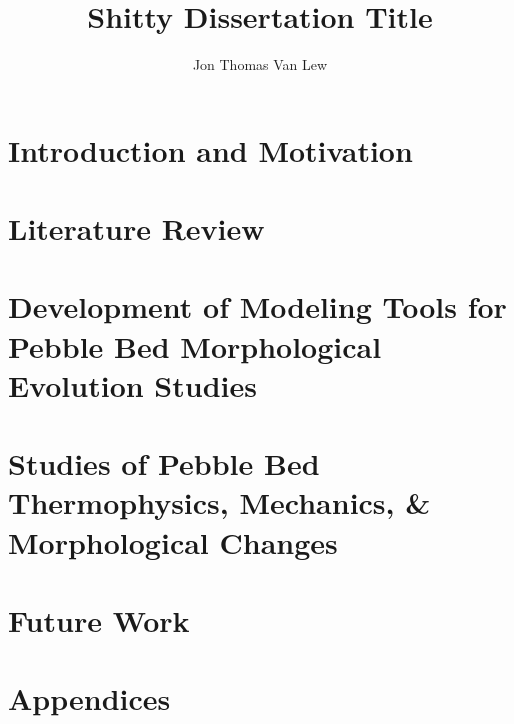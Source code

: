 \documentclass [PhD] {uclathes}
\title          {Shitty Dissertation Title}
\author         {Jon Thomas Van Lew}
\begin{document}

\tableofcontents               %
%


\part{Introduction and Motivation}


\part{Literature Review}




\part{Development of Modeling Tools for Pebble Bed Morphological Evolution Studies}






\part{Studies of Pebble Bed Thermophysics, Mechanics, \&  Morphological Changes}





\part{Future Work}

\part{Appendices}
\appendix







\end{document}
